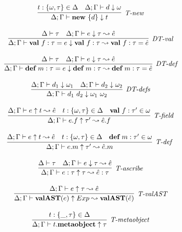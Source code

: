 \begin{figure}
\centering
\[
\begin{array}{c}

\infer[\textit{T-new}]
	{\Delta; \Gamma \vdash \keyw{new}\ \{ d \} \downarrow  t }
	{ t:\{\omega,\tau\} \in \Delta & \Delta;\Gamma \vdash d \downarrow \omega} \\[3ex]


\infer[\textit{DT-val}]
	{\Delta; \Gamma \vdash \keyw{val}~ f:\tau = e \downarrow \keyw{val}~ f:\tau  \leadsto \keyw{val}~ f:\tau = \hat{e}}
	{\Delta \vdash \tau &\Delta; \Gamma \vdash e \downarrow \tau \leadsto \hat{e} } \\[3ex]
	
\infer[\textit{DT-def}]
	{\Delta; \Gamma \vdash \keyw{def}~ m:\tau = e \downarrow \keyw{def}~ m:\tau \leadsto \keyw{def}~ m:\tau = \hat{e} }
	{\Delta \vdash \tau  & \Delta; \Gamma \vdash e  \downarrow \tau \leadsto \hat{e} } \\[3ex]

	
\infer[\textit{DT-defs}]
	{\Delta; \Gamma \vdash d_1\ d_2 \downarrow \omega_1\ \omega_2 }
	{\Delta; \Gamma \vdash d_1 \downarrow \omega_1 &  \Delta; \Gamma \vdash d_2 \downarrow \omega_2 } \\[3ex]


\infer[\textit{T-field}]
	{\Delta; \Gamma \vdash  e.f \uparrow \tau' \leadsto \hat{e}.f} 
	{\Delta; \Gamma \vdash e \uparrow t \leadsto \hat{e} & t:\{\omega, \tau\}\in \Delta & \keyw{val}\ f:\tau' \in \omega  }\\[3ex]

 
\infer[\textit{T-def }]
	{\Delta; \Gamma \vdash  e.m \uparrow\tau' \leadsto \hat{e}.m} 
	{\Delta; \Gamma \vdash e \uparrow t \leadsto \hat{e} & t: \{\omega, \tau\} \in \Delta & \keyw{def}\ m:\tau' \in \omega }\\[3ex]

\infer[\textit{T-ascribe}]
	{\Delta; \Gamma  \vdash  e:\tau \uparrow \tau \leadsto \hat{e}:\tau}
	{\Delta \vdash \tau & \Delta; \Gamma \vdash e \downarrow \tau \leadsto \hat{e} } \\[3ex]

\infer[\textit{T-valAST}]
        {\Delta; \Gamma \vdash \keyw{valAST}(e)\uparrow Exp \leadsto \keyw{valAST}(\hat{e}) }
	{\Delta; \Gamma \vdash e \uparrow \tau \leadsto \hat{e}} \\[3ex]

\infer[\textit{T-metaobject}]
        {\Delta; \Gamma \vdash t.\keyw{metaobject} \uparrow \tau   }
	{t:\{\_, \tau\} \in \Delta} \\[3ex]


\end{array}\]
\end{figure}
